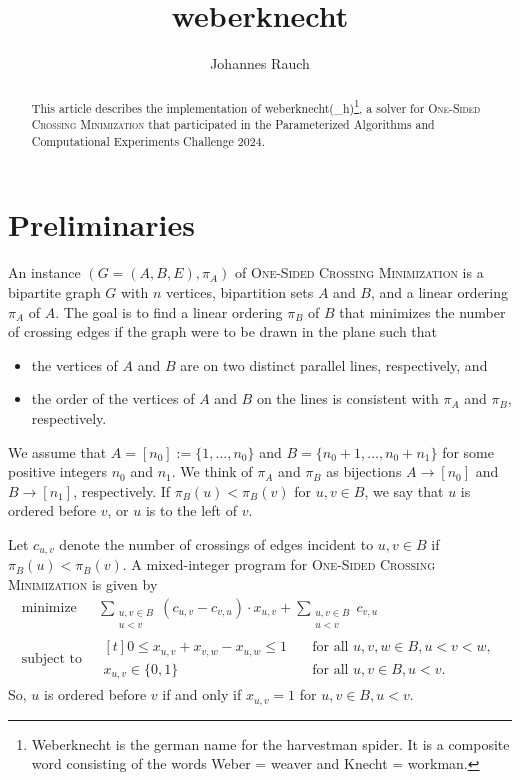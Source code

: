 \documentclass[a4paper,UKenglish,cleveref, autoref, thm-restate]{lipics-v2021}
\title{\textsf{weberknecht}}
\author{Johannes Rauch}
{Ulm University, Institute of Optimization and Operations Research, Germany}
{johannes.rauch@uni-ulm.de}
{https://orcid.org/0000-0002-6925-8830}
{}%
\newcommand{\OSCM}{\textsc{One-Sided Crossing Minimization}}
\begin{document}
\maketitle

\begin{abstract}
This article describes the implementation of \textsf{weberknecht(\_h)}\footnote{Weberknecht is the german name for the harvestman spider. It is a composite word consisting of the words Weber = weaver and Knecht = workman. 
}, a solver for \OSCM{} that participated in the Parameterized Algorithms and Computational Experiments Challenge 2024.
\end{abstract}

\section{Preliminaries}\label{sec:pre}
An instance $(G = (A, B, E), \pi_A)$ of \OSCM{} is a bipartite graph $G$ with $n$ vertices, bipartition sets $A$ and $B$, and a linear ordering $\pi_A$ of $A$.
The goal is to find a linear ordering $\pi_B$ of $B$ that minimizes the number of crossing edges if the graph were to be drawn in the plane such that
\begin{itemize}
	\item the vertices of $A$ and $B$ are on two distinct parallel lines, respectively, and 
	\item the order of the vertices of $A$ and $B$ on the lines is consistent with $\pi_A$ and $\pi_B$, respectively.
\end{itemize}
We assume that $A = [n_0] := \{1, \dots, n_0\}$ and $B = \{n_0 + 1, \dots, n_0 + n_1\}$ for some positive integers $n_0$ and $n_1$.
We think of $\pi_A$ and $\pi_B$ as bijections $A \rightarrow [n_0]$ and $B \rightarrow [n_1]$, respectively.
If $\pi_B(u) < \pi_B(v)$ for $u, v \in B$, we say that $u$ is ordered before $v$, or $u$ is to the left of $v$.

Let $c_{u,v}$ denote the number of crossings of edges incident to $u, v \in B$ if $\pi_B(u) < \pi_B(v)$.
A mixed-integer program for \OSCM{} is given by
\begin{equation}
\label{mip}
\begin{alignedat}{2}
\text{minimize } &\sum_{\substack{u, v \in B\\u < v}} (c_{u,v} - c_{v,u}) \cdot x_{u,v} + \sum_{\substack{u, v \in B\\u < v}} c_{v,u}\\
\text{subject to } &\begin{aligned}[t]
0 \leq x_{u,v} + x_{v,w} - x_{u,w} \leq 1 &\quad\text{for all }u,v,w \in B, u < v < w,\\
x_{u,v} \in \{0,1\} &\quad\text{for all }u,v \in B, u < v.
\end{aligned}
\end{alignedat}\tag{$P_I$}
\end{equation}
So, $u$ is ordered before $v$ if and only if $x_{u,v} = 1$ for $u, v \in B, u < v$.
\end{document}
